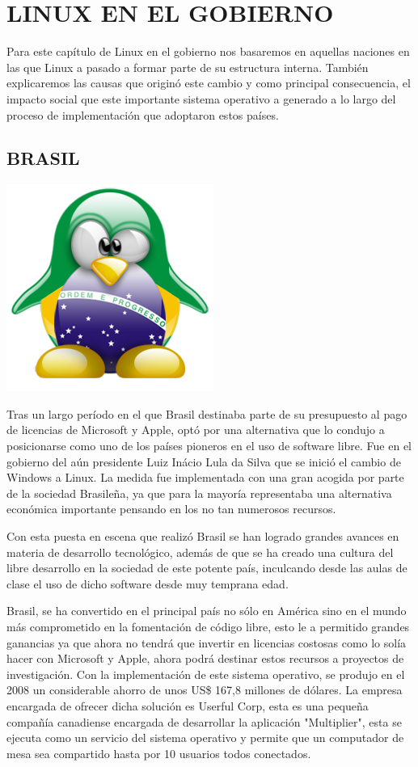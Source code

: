 \chapter*{LINUX EN EL GOBIERNO}
Para este capítulo de Linux en el gobierno nos basaremos en aquellas naciones en las que Linux a pasado a formar parte de su estructura interna. También explicaremos las 
causas que originó este cambio y como principal consecuencia, el impacto social que este importante sistema operativo a generado a lo largo del proceso de implementación que 
adoptaron estos países.

\section*{BRASIL}
\includegraphics[scale=1]{img/cp03/img0301.png}

Tras un largo período en el que Brasil destinaba parte de su presupuesto al pago de licencias de Microsoft y Apple, optó por una alternativa que lo condujo a posicionarse 
como uno de los países pioneros en el uso de software libre. Fue en el gobierno del aún presidente Luiz Inácio Lula da Silva que se inició el cambio de Windows a Linux. La 
medida fue implementada con una gran acogida por parte de la sociedad Brasileña, ya que para la mayoría representaba una alternativa económica importante pensando en los no 
tan numerosos recursos.

Con esta puesta en escena que realizó Brasil se han logrado grandes avances en materia de desarrollo tecnológico, además de que se ha creado una cultura del libre desarrollo 
en la sociedad de este potente país, inculcando desde las aulas de clase el uso de dicho software desde muy temprana edad.

Brasil, se ha convertido en el principal país no sólo en América sino en el mundo más comprometido en la fomentación de código libre, esto le a permitido grandes ganancias ya 
que ahora no tendrá que invertir en licencias costosas como lo solía hacer con Microsoft y Apple, ahora podrá destinar estos recursos a proyectos de investigación. Con la 
implementación de este sistema operativo, se produjo en el 2008 un considerable ahorro de unos US\$ 167,8 millones de dólares. La empresa encargada de ofrecer dicha solución 
es Userful Corp, esta es una pequeña compañía canadiense encargada de desarrollar la aplicación "Multiplier", esta se ejecuta como un servicio del sistema operativo y permite 
que un computador de mesa sea compartido hasta por 10 usuarios todos conectados.

